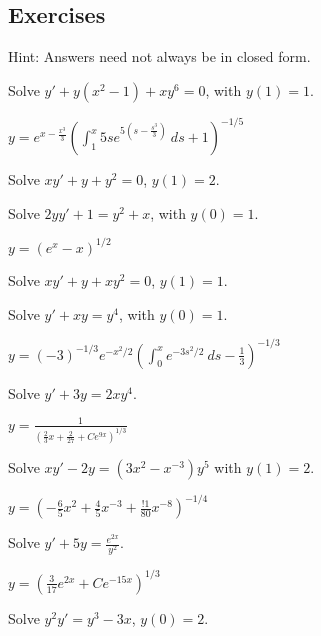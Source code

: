 \subsection{Exercises}

Hint: Answers need not always be in closed form.

\begin{exercise}
Solve
$y'+ y(x^2-1)+xy^6 = 0$, with $y(1)=1$.
\end{exercise}
\comboSol{%
}
{%
$y = e^{x - \frac{x^3}{3}}\left(\int_1^x 5se^{5(s - \frac{s^3}{3})}\ ds + 1 \right)^{-1/5}$
}

\begin{exercise}\ansMark%
Solve $xy'+y+y^2 = 0$, $y(1)=2$.
\end{exercise}

\begin{exercise}
Solve $2yy' + 1 = y^2 + x$, with $y(0)=1$.
\end{exercise}
\comboSol{%
}
{%
$y = (e^x - x)^{1/2}$
}

\begin{exercise}\ansMark%
Solve $xy'+y +xy^2 = 0$, $y(1)=1$.
\end{exercise}

\begin{exercise}
Solve $y' + xy = y^4$, with $y(0)=1$.
\end{exercise}
\comboSol{%
}
{%
$y = (-3)^{-1/3}e^{-x^2/2}\left(\int_0^x e^{-3s^2/2}\ ds - \frac{1}{3} \right)^{-1/3}$
}

\begin{exercise}
Solve $y' + 3y = 2xy^4$.
\end{exercise}
\comboSol{%
}
{%
$y = \frac{1}{\left( \frac{2}{3}x + \frac{2}{27} + Ce^{9x}\right)^{1/3}}$
}

\begin{exercise}
Solve $xy' - 2y = (3x^2 - x^{-3})y^5$ with $y(1) = 2$. 
\end{exercise}
\comboSol{%
}
{%
$y = \left( -\frac{6}{5}x^2 + \frac{4}{5}x^{-3} + \frac{!1}{80}x^{-8} \right)^{-1/4}$
}

\begin{exercise}
Solve $y' + 5y = \frac{e^{2x}}{y^2}$.
\end{exercise}
\comboSol{%
}
{%
$y = \left( \frac{3}{17}e^{2x} + Ce^{-15x} \right)^{1/3}$
}

\begin{exercise}\ansMark%
Solve $y^2y' = y^3-3x$, $y(0)=2$.
\end{exercise}

